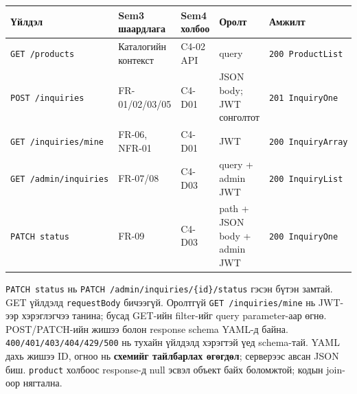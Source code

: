 \documentclass[
  mongolian,
]{article}
\begin{document}
\begin{longtable}[]{@{}
  >{\raggedright\arraybackslash}p{}
  >{\raggedright\arraybackslash}p{}
  >{\raggedright\arraybackslash}p{}
  >{\raggedright\arraybackslash}p{}
  >{\raggedright\arraybackslash}p{}@{}}
\toprule\noalign{}
\begin{minipage}[b]{\linewidth}\raggedright
Үйлдэл
\end{minipage} & \begin{minipage}[b]{\linewidth}\raggedright
Sem3 шаардлага
\end{minipage} & \begin{minipage}[b]{\linewidth}\raggedright
Sem4 холбоо
\end{minipage} & \begin{minipage}[b]{\linewidth}\raggedright
Оролт
\end{minipage} & \begin{minipage}[b]{\linewidth}\raggedright
Амжилт
\end{minipage} \\
\midrule\noalign{}
\endhead
\bottomrule\noalign{}
\endlastfoot
\texttt{GET\ /products} & Каталогийн контекст & C4-02 API & query &
\texttt{200\ ProductList} \\
\texttt{POST\ /inquiries} & FR-01/02/03/05 & C4-D01 & JSON body; JWT
сонголтот & \texttt{201\ InquiryOne} \\
\texttt{GET\ /inquiries/mine} & FR-06, NFR-01 & C4-D01 & JWT &
\texttt{200\ InquiryArray} \\
\texttt{GET\ /admin/inquiries} & FR-07/08 & C4-D03 & query + admin JWT &
\texttt{200\ InquiryList} \\
\texttt{PATCH\ status} & FR-09 & C4-D03 & path + JSON body + admin JWT &
\texttt{200\ InquiryOne} \\
\end{longtable}

\texttt{PATCH\ status} нь \texttt{PATCH\ /admin/inquiries/\{id\}/status}
гэсэн бүтэн замтай. GET үйлдэлд \texttt{requestBody} бичээгүй. Оролтгүй
\texttt{GET\ /inquiries/mine} нь JWT-ээр хэрэглэгчээ танина; бусад
GET-ийн filter-ийг query parameter-аар өгнө. POST/PATCH-ийн жишээ болон
response schema YAML-д байна. \texttt{400/401/403/404/429/500} нь тухайн
үйлдэлд хэрэгтэй үед schema-тай. YAML дахь жишээ ID, огноо нь
\textbf{схемийг тайлбарлах өгөгдөл}; серверээс авсан JSON биш.
\texttt{product} холбоос response-д null эсвэл объект байх боломжтой;
кодын join-оор нягтална.
\end{document}
